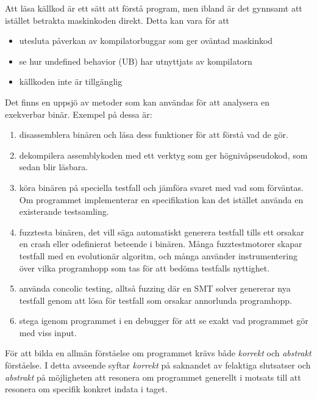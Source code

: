 
Att läsa källkod är ett sätt att förstå program, men ibland är det gynnsamt att istället betrakta
maskinkoden direkt. Detta kan vara för att
\begin{itemize}
  \item utesluta påverkan av kompilatorbuggar som ger oväntad maskinkod
  \item se hur undefined behavior (UB) har utnyttjats av kompilatorn
  \item källkoden inte är tillgänglig
\end{itemize}

Det finns en uppsjö av metoder som kan användas för att analysera en exekverbar
binär. Exempel på dessa är:
\begin{enumerate}
  \item disassemblera binären och läsa dess funktioner för att förstå vad de gör.
  \item dekompilera assemblykoden med ett verktyg som ger högnivåpseudokod, som sedan blir läsbara.
  \item köra binären på speciella testfall och jämföra svaret med vad som förväntas. Om
    programmet implementerar en specifikation kan det istället använda en existerande testsamling.
  \item fuzztesta binären, det vill säga automatiskt generera testfall tills ett orsakar en crash eller
    odefinierat beteende i binären. Många fuzztestmotorer skapar testfall med en evolutionär
    algoritm, och många använder instrumentering över vilka programhopp som tas för att bedöma
    testfalls nyttighet.
  \item använda concolic testing, alltså fuzzing där en SMT solver genererar nya testfall genom att
    lösa för testfall som orsakar annorlunda programhopp.
  \item stega igenom programmet i en debugger för att se exakt vad programmet gör med viss input.
\end{enumerate}

För att bilda en allmän förståelse om programmet krävs både \textit{korrekt} och \textit{abstrakt} förståelse. 
I detta avseende syftar \textit{korrekt} på saknandet av felaktiga slutsatser
och \textit{abstrakt} på möjligheten att resonera om programmet generellt i
motsats till att resonera om specifik konkret indata i taget.

